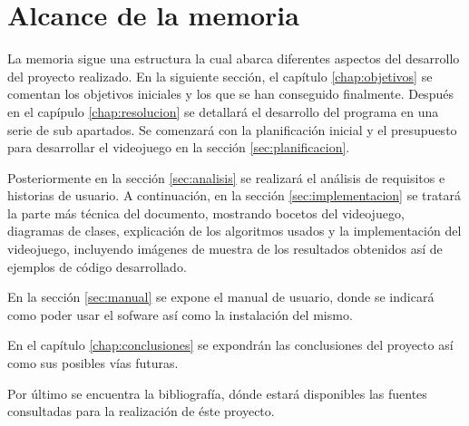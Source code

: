 \section{Alcance de la memoria}

La memoria sigue una estructura la cual abarca diferentes aspectos del desarrollo del proyecto realizado. En la siguiente sección, el capítulo \ref{chap:objetivos} se comentan los objetivos iniciales y los que se han conseguido finalmente. Después en el capípulo \ref{chap:resolucion} se detallará el desarrollo del programa en una serie de sub apartados. Se comenzará con la planificación inicial y el presupuesto para desarrollar el videojuego en la sección \ref{sec:planificacion}. 

Posteriormente en la sección \ref{sec:analisis} se realizará el análisis de requisitos e historias de usuario. A continuación, en la sección \ref{sec:implementacion} se tratará la parte más técnica del documento, mostrando bocetos del videojuego, diagramas de clases, explicación de los algoritmos usados y la implementación del videojuego, incluyendo imágenes de muestra de los resultados obtenidos así de ejemplos de código desarrollado.

En la sección \ref{sec:manual} se expone el manual de usuario, donde se indicará como poder usar el sofware así como la instalación del mismo.

En el capítulo \ref{chap:conclusiones} se expondrán las conclusiones del proyecto así como sus posibles vías futuras.

Por último se encuentra la bibliografía, dónde estará disponibles las fuentes consultadas para la realización de éste proyecto.